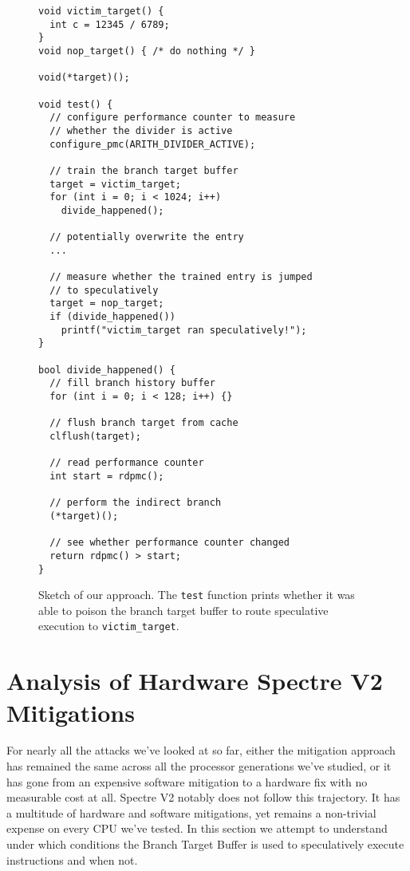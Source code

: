 
\begin{figure}[h]
\begin{lstlisting}
void victim_target() {
  int c = 12345 / 6789;
}
void nop_target() { /* do nothing */ }

void(*target)();

void test() {
  // configure performance counter to measure
  // whether the divider is active
  configure_pmc(ARITH_DIVIDER_ACTIVE);

  // train the branch target buffer
  target = victim_target;
  for (int i = 0; i < 1024; i++)
    divide_happened();

  // potentially overwrite the entry
  ...

  // measure whether the trained entry is jumped
  // to speculatively
  target = nop_target;
  if (divide_happened())
    printf("victim_target ran speculatively!");
}

bool divide_happened() {
  // fill branch history buffer
  for (int i = 0; i < 128; i++) {}

  // flush branch target from cache
  clflush(target);

  // read performance counter
  int start = rdpmc();

  // perform the indirect branch
  (*target)();

  // see whether performance counter changed
  return rdpmc() > start;
}\end{lstlisting}
\caption{Sketch of our approach. The \texttt{test} function prints whether it was able to poison the branch target buffer to route speculative execution to \texttt{victim\_target}.}
\label{fig:spectre2-sample}
\end{figure}

\section{Analysis of Hardware Spectre V2 Mitigations}
\label{s:analysis}

For nearly all the attacks we've looked at so far, either the mitigation approach has remained the same across all the processor generations we've studied, or it has gone from an expensive software mitigation to a hardware fix with no measurable cost at all.
Spectre V2 notably does not follow this trajectory.
It has a multitude of hardware and software mitigations, yet remains a non-trivial expense on every CPU we've tested.
In this section we attempt to understand under which conditions the
Branch Target Buffer is used to speculatively execute instructions and when not.


